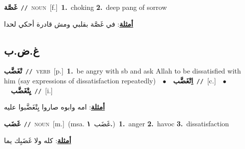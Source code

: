 \documentclass[10pt,a4paper,twoside]{article} %
\begin{document}
\begin{multicols}{2}
{\setlength\topsep{0pt}\textbf{\foreignlanguage{arabic}{غَصَّة}}\ {\color{gray}\texttt{//}\color{black}}\ \textsc{noun}\ [f.]\ \textbf{1.}~choking  \textbf{2.}~deep pang of sorrow\  \begin{flushright}\color{gray}\foreignlanguage{arabic}{\textbf{\underline{\foreignlanguage{arabic}{أمثلة}}}: في غَصَّة بقلبي ومش قادرة أحكي لحدا}\end{flushright}\color{black}} \vspace{2mm}

\vspace{-3mm}
\subsection*{\color{blue}\foreignlanguage{arabic}{غ.ض.ب}\color{blue}{}} 

{\setlength\topsep{0pt}\textbf{\foreignlanguage{arabic}{تْغَضَّب}}\ {\color{gray}\texttt{//}\color{black}}\ \textsc{verb}\ [p.]\ \textbf{1.}~be angry with sb and ask Allah to be dissatisfied with him (say expressions of dissatisfaction repeatedly)\ \ $\bullet$\ \ \setlength\topsep{0pt}\textbf{\foreignlanguage{arabic}{اِتْغَضَّب}}\ {\color{gray}\texttt{//}\color{black}}\ [c.]\ \ $\bullet$\ \ \setlength\topsep{0pt}\textbf{\foreignlanguage{arabic}{يِتْغَضَّب}}\ {\color{gray}\texttt{//}\color{black}}\ [i.]\  \begin{flushright}\color{gray}\foreignlanguage{arabic}{\textbf{\underline{\foreignlanguage{arabic}{أمثلة}}}: امه وابوه صاروا يِتْغَضَّبوا عليه}\end{flushright}\color{black}} \vspace{2mm}

{\setlength\topsep{0pt}\textbf{\foreignlanguage{arabic}{غَضَب}}\ {\color{gray}\texttt{//}\color{black}}\ \textsc{noun}\ [m.]\ \color{gray}(msa. \foreignlanguage{arabic}{غَضَب}~\foreignlanguage{arabic}{\textbf{١.}})\color{black}\ \textbf{1.}~anger  \textbf{2.}~havoc  \textbf{3.}~dissatisfaction\  \begin{flushright}\color{gray}\foreignlanguage{arabic}{\textbf{\underline{\foreignlanguage{arabic}{أمثلة}}}: كله ولا غَضَبِك يما}\end{flushright}\color{black}} \vspace{2mm}


\end{multicols}
\end{document}
